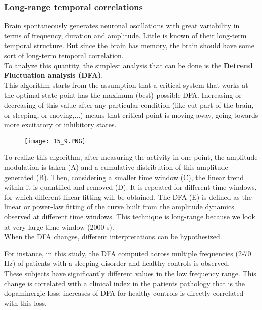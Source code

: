 \subsubsection{Long-range temporal correlations}
Brain spontaneously generates neuronal oscillations with great variability in terms of frequency, duration and amplitude. Little is known of their long-term temporal structure. But since the brain has memory, the brain should have some sort of long-term temporal correlation.\\
To analyze this quantity, the simplest analysis that can be done is the \textbf{Detrend Fluctuation analysis (DFA)}.\\
This algorithm starts from the assumption that a critical system that works at the optimal state point has the maximum (best) possible DFA. Increasing or decreasing of this value after any particular condition (like cut part of the brain, or sleeping, or moving,...) means that critical point is moving away, going towards more excitatory or inhibitory states.
\begin{figure}[H]
    \centering
    \texttt{[image: 15\_9.PNG]}
\end{figure}
To realize this algorithm, after measuring the activity in one point, the amplitude modulation is taken (A) and a cumulative distribution of this amplitude generated (B). Then, considering a smaller time window (C), the linear trend within it is quantified and removed (D). It is repeated for different time windows, for which different linear fitting will be obtained. The DFA (E) is defined as the linear or power-law fitting of the curve built from the amplitude dynamics observed at different time windows. This technique is long-range because we look at very large time window (2000 s).\\
When the DFA changes, different interpretations can be hypothesized.
\begin{figure}[H]
    \centering
\end{figure}
For instance, in this study, the DFA computed across multiple frequencies (2-70 Hz) of patients with a sleeping disorder and healthy controls is observed.\\
These subjects have significantly different values in the low frequency range. This change is correlated with a clinical index in the patients pathology that is the dopaminergic loss: increases of DFA for healthy controls is directly correlated with this loss.


